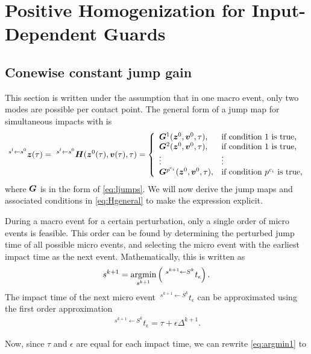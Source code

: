 \documentclass[DC2017114Bouma.tex]{subfiles}
\begin{document}
\cleartooddpage
\chapter{Positive Homogenization for Input-Dependent Guards}
\section{Conewise constant jump gain}
This section is written under the assumption that in one macro event, only two modes are possible per contact point. The general form of a jump map for simultaneous impacts with is 
\begin{align}
\ ^{s^l\leftarrow s^0}{\boldsymbol{z}}(\tau)= \ ^{s^l \leftarrow s^0}{\boldsymbol{H}}({\boldsymbol{z}}^{0}(\tau),{\boldsymbol{v}}(\tau),\tau) = \left\lbrace\begin{array}{ll}
{\boldsymbol{G}}^1({\boldsymbol{z}}^0,{\boldsymbol{v}}^0,\tau), & \text{if condition 1 is true},\\
{\boldsymbol{G}}^2({\boldsymbol{z}}^0,{\boldsymbol{v}}^0,\tau), & \text{if condition 1 is true},\\
\vdots & \vdots\\
{\boldsymbol{G}}^{p^{c_i}}({\boldsymbol{z}}^0,{\boldsymbol{v}}^0,\tau), & \text{if condition }p^{c_i}\text{ is true},
\end{array}\right.\label{eq:Hgeneral}
\end{align}
where ${\boldsymbol{G}}$ is in the form of \eqref{eq:ljumps}. We will now derive the jump maps and associated conditions in \eqref{eq:Hgeneral} to make the expression explicit.

During a macro event for a certain perturbation, only a single order of micro events is feasible. This order can be found by determining the perturbed jump time of all possible micro events, and selecting the micro event with the earliest impact time as the next event. Mathematically, this is written as
\begin{align}
s^{k+1} = \underset{s^{k+1}}{\operatorname{\text{argmin}}}\left(\ ^{s^{k+1} \leftarrow S^{k}}t_\epsilon\right).\label{eq:argmin1}
\end{align}
The impact time of the next micro event $\ ^{s^{k+1} \leftarrow S^{k}}t_\epsilon$ can be approximated using the first order approximation
\begin{align}
\ ^{s^{k+1} \leftarrow S^{k}}t_\epsilon = \tau + \epsilon\Delta^{k+1}.
\end{align}

Now, since $\tau$ and $\epsilon$ are equal for each impact time, we can rewrite \eqref{eq:argmin1} to
\end{document}
